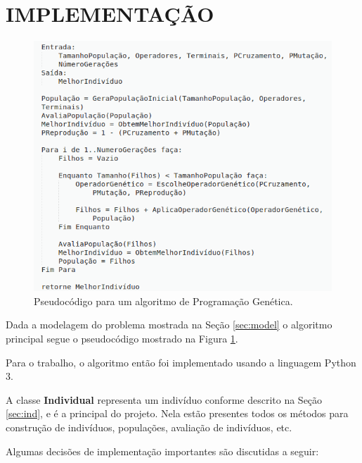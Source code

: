 \documentclass[12pt]{article}
\begin{document}
\section{IMPLEMENTAÇÃO}

\begin{figure}[ht]
\centering
\includegraphics[width=1\textwidth]{gp_code.png}
\caption{Pseudocódigo para um algoritmo de Programação Genética.}
\label{fig:gp_code}
\end{figure}

Dada a modelagem do problema mostrada na Seção \ref{sec:model} o algoritmo principal
segue o pseudocódigo mostrado na Figura \ref{fig:gp_code}.

Para o trabalho, o algoritmo então foi implementado usando a linguagem Python 3.

A classe \textbf{Individual} representa um indivíduo conforme descrito na Seção
\ref{sec:ind}, e é a principal do projeto. Nela estão presentes todos os métodos 
para construção de indivíduos, populações, avaliação de indivíduos, etc.

Algumas decisões de implementação importantes são discutidas a seguir:
\end{document}
